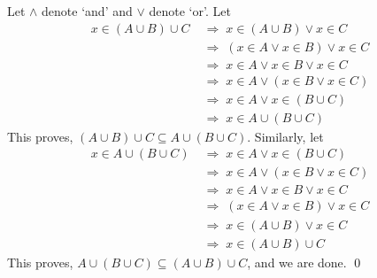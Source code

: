 \documentclass[10pt]{article}
\begin{document}
\begin{enumerate}
                Let $\land$ denote `and' and $\lor$ denote `or'. Let
                \begin{align*}
                        x \in (A \cup B) \cup C
                                \;&\Rightarrow\; x \in (A \cup B) \lor x \in C\\
                                \;&\Rightarrow\; (x \in A \lor x \in B) \lor x \in C\\
                                \;&\Rightarrow\; x \in A \lor x \in B \lor x \in C\\
                                \;&\Rightarrow\; x \in A \lor (x \in B \lor x \in C)\\
                                \;&\Rightarrow\; x \in A \lor x \in (B \cup C)\\
                                \;&\Rightarrow\; x \in A \cup (B \cup C)
                \end{align*}
                This proves, $(A \cup B) \cup C \subseteq A \cup (B \cup C)$. Similarly, let
                \begin{align*}
                        x \in A \cup (B \cup C)
                                \;&\Rightarrow\; x \in A \lor x \in (B \cup C)\\
                                \;&\Rightarrow\; x \in A \lor (x \in B \lor x \in C)\\
                                \;&\Rightarrow\; x \in A \lor x \in B \lor x \in C\\
                                \;&\Rightarrow\; (x \in A \lor x \in B) \lor x \in C\\
                                \;&\Rightarrow\; x \in (A \cup B) \lor x \in C\\
                                \;&\Rightarrow\; x \in (A \cup B) \cup C
                \end{align*}
                This proves, $A \cup (B \cup C) \subseteq (A \cup B) \cup C$, and we are done. \qed
                

\end{enumerate}
\end{document}
